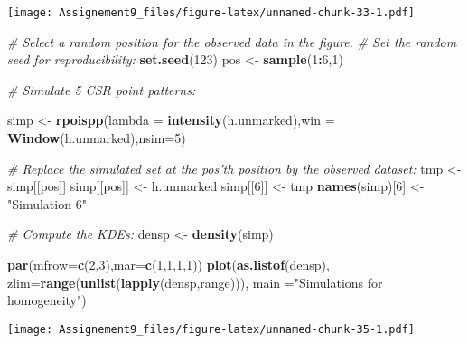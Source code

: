 \documentclass[]{article}
\newenvironment{Shaded}{\begin{snugshade}}{\end{snugshade}}
\newcommand{\CommentTok}[1]{\textcolor[rgb]{0.56,0.35,0.01}{\textit{#1}}}
\newcommand{\DataTypeTok}[1]{\textcolor[rgb]{0.13,0.29,0.53}{#1}}
\newcommand{\DecValTok}[1]{\textcolor[rgb]{0.00,0.00,0.81}{#1}}
\newcommand{\KeywordTok}[1]{\textcolor[rgb]{0.13,0.29,0.53}{\textbf{#1}}}
\newcommand{\NormalTok}[1]{#1}
\newcommand{\OperatorTok}[1]{\textcolor[rgb]{0.81,0.36,0.00}{\textbf{#1}}}
\newcommand{\StringTok}[1]{\textcolor[rgb]{0.31,0.60,0.02}{#1}}
\begin{document}
\texttt{[image: Assignement9\_files/figure-latex/unnamed-chunk-33-1.pdf]}

\begin{Shaded}
\begin{Highlighting}[]
\CommentTok{# Select a random position for the observed data in the figure.}
\CommentTok{# Set the random seed for reproducibility:}
\KeywordTok{set.seed}\NormalTok{(}\DecValTok{123}\NormalTok{) }
\NormalTok{pos <-}\StringTok{ }\KeywordTok{sample}\NormalTok{(}\DecValTok{1}\OperatorTok{:}\DecValTok{6}\NormalTok{,}\DecValTok{1}\NormalTok{)}

\CommentTok{# Simulate 5 CSR point patterns:}

\NormalTok{simp <-}\StringTok{ }\KeywordTok{rpoispp}\NormalTok{(}\DataTypeTok{lambda =} \KeywordTok{intensity}\NormalTok{(h.unmarked),}\DataTypeTok{win =} \KeywordTok{Window}\NormalTok{(h.unmarked),}\DataTypeTok{nsim=}\DecValTok{5}\NormalTok{)}

\CommentTok{# Replace the simulated set at the pos'th position by the observed dataset:}
\NormalTok{tmp <-}\StringTok{ }\NormalTok{simp[[pos]]}
\NormalTok{simp[[pos]] <-}\StringTok{ }\NormalTok{h.unmarked}
\NormalTok{simp[[}\DecValTok{6}\NormalTok{]] <-}\StringTok{ }\NormalTok{tmp}
\KeywordTok{names}\NormalTok{(simp)[}\DecValTok{6}\NormalTok{] <-}\StringTok{ "Simulation 6"}

\CommentTok{# Compute the KDEs:}
\NormalTok{densp <-}\StringTok{ }\KeywordTok{density}\NormalTok{(simp)}
\end{Highlighting}
\end{Shaded}

\begin{Shaded}
\begin{Highlighting}[]
\KeywordTok{par}\NormalTok{(}\DataTypeTok{mfrow=}\KeywordTok{c}\NormalTok{(}\DecValTok{2}\NormalTok{,}\DecValTok{3}\NormalTok{),}\DataTypeTok{mar=}\KeywordTok{c}\NormalTok{(}\DecValTok{1}\NormalTok{,}\DecValTok{1}\NormalTok{,}\DecValTok{1}\NormalTok{,}\DecValTok{1}\NormalTok{))}
\KeywordTok{plot}\NormalTok{(}\KeywordTok{as.listof}\NormalTok{(densp), }\DataTypeTok{zlim=}\KeywordTok{range}\NormalTok{(}\KeywordTok{unlist}\NormalTok{(}\KeywordTok{lapply}\NormalTok{(densp,range))),}
     \DataTypeTok{main =}\StringTok{"Simulations for homogeneity"}\NormalTok{)}
\end{Highlighting}
\end{Shaded}

\texttt{[image: Assignement9\_files/figure-latex/unnamed-chunk-35-1.pdf]}
\end{document}
